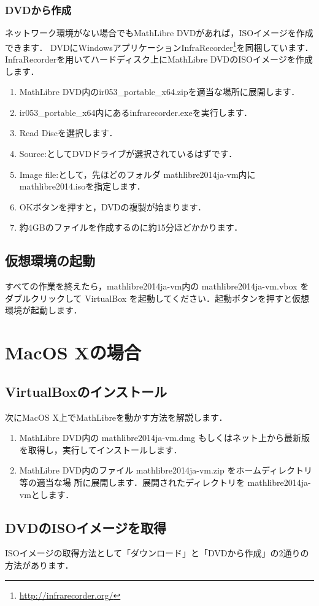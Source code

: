 \documentclass[a4j]{jsarticle}
\newcommand{\ir}{ir053\_portable\_x64}
\newcommand{\vm}{mathlibre2014ja-vm}
\begin{document}
\subsubsection{DVDから作成}
ネットワーク環境がない場合でもMathLibre DVDがあれば，ISOイメージを作成できます．
DVDにWindowsアプリケーションInfraRecorder\footnote{\url{http://infrarecorder.org/}}を同梱しています．
InfraRecorderを用いてハードディスク上にMathLibre DVDのISOイメージを作成
します．
\begin{enumerate}
 \item MathLibre DVD内の\ir.zipを適当な場所に展開します．
 \item \ir 内にあるinfrarecorder.exeを実行します．
 \item Read Discを選択します．
 \item Source:としてDVDドライブが選択されているはずです．
 \item Image file:として，先ほどのフォルダ \vm 内にmathlibre2014.isoを指定します．
 \item OKボタンを押すと，DVDの複製が始まります．
 \item 約4GBのファイルを作成するのに約15分ほどかかります．
\end{enumerate}

\subsection{仮想環境の起動}
すべての作業を終えたら，\vm 内の \vm.vbox をダブルクリックして
VirtualBox を起動してください．起動ボタンを押すと仮想環境が起動します．

\section{MacOS Xの場合}
\subsection{VirtualBoxのインストール}
次にMacOS X上でMathLibreを動かす方法を解説します．
\begin{enumerate}
 \item MathLibre DVD内の \vm.dmg もしくはネット上から最新版を取得し，実行してインストールします．
 \item MathLibre DVD内のファイル \vm.zip をホームディレクトリ等の適当な場
       所に展開します．展開されたディレクトリを \vm とします．
\end{enumerate}

\subsection{DVDのISOイメージを取得}
ISOイメージの取得方法として「ダウンロード」と「DVDから作成」の2通りの方法があります．
\end{document}
